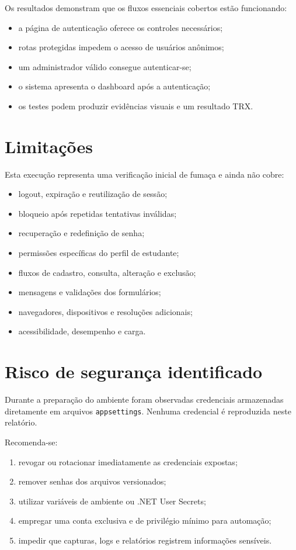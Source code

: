 \documentclass[12pt,a4paper]{article}
\begin{document}
Os resultados demonstram que os fluxos essenciais cobertos estão funcionando:

\begin{itemize}
  \item a página de autenticação oferece os controles necessários;
  \item rotas protegidas impedem o acesso de usuários anônimos;
  \item um administrador válido consegue autenticar-se;
  \item o sistema apresenta o dashboard após a autenticação;
  \item os testes podem produzir evidências visuais e um resultado TRX.
\end{itemize}

\section{Limitações}

Esta execução representa uma verificação inicial de fumaça e ainda não cobre:

\begin{itemize}
  \item logout, expiração e reutilização de sessão;
  \item bloqueio após repetidas tentativas inválidas;
  \item recuperação e redefinição de senha;
  \item permissões específicas do perfil de estudante;
  \item fluxos de cadastro, consulta, alteração e exclusão;
  \item mensagens e validações dos formulários;
  \item navegadores, dispositivos e resoluções adicionais;
  \item acessibilidade, desempenho e carga.
\end{itemize}

\section{Risco de segurança identificado}

Durante a preparação do ambiente foram observadas credenciais armazenadas
diretamente em arquivos \texttt{appsettings}. Nenhuma credencial é reproduzida
neste relatório.

Recomenda-se:

\begin{enumerate}[label=\arabic*.]
  \item revogar ou rotacionar imediatamente as credenciais expostas;
  \item remover senhas dos arquivos versionados;
  \item utilizar variáveis de ambiente ou .NET User Secrets;
  \item empregar uma conta exclusiva e de privilégio mínimo para automação;
  \item impedir que capturas, logs e relatórios registrem informações sensíveis.
\end{enumerate}
\end{document}
